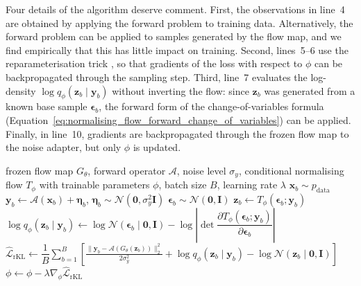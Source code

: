 \documentclass[12pt,a4paper]{report}
\begin{document}
Four details of the algorithm deserve comment. First, the observations in line~4 are obtained by applying the forward problem to training data. Alternatively, the forward problem can be applied to samples generated by the flow map, and we find empirically that this has little impact on training. Second, lines~5--6 use the reparameterisation trick \parencite{kingma2022autoencodingvariationalbayes}, so that gradients of the loss with respect to $\phi$ can be backpropagated through the sampling step.
Third, line~7 evaluates the log-density $\log q_{\phi}(\mathbf{z}_b\mid\mathbf{y}_b)$ without inverting the flow: since $\mathbf{z}_b$ was generated from a known base sample $\boldsymbol{\epsilon}_b$, the forward form of the change-of-variables formula (Equation~\ref{eq:normalising_flow_forward_change_of_variables}) can be applied. Finally, in line~10, gradients are backpropagated through the frozen flow map to the noise adapter, but only $\phi$ is updated.

\begin{algorithm}[H]
\caption{Training the noise adapter with the reverse-KL objective}
\label{alg:rkl}
\begin{algorithmic}[1]
\Require frozen flow map $G_{\theta}$, forward operator $\mathcal{A}$, noise level $\sigma_y$, conditional normalising flow $T_{\phi}$ with trainable parameters $\phi$, batch size $B$, learning rate $\lambda$
\Repeat
    \State $\mathbf{x}_b\sim p_{\mathrm{data}}$
    \State $\mathbf{y}_b\gets\mathcal{A}(\mathbf{x}_b)+\boldsymbol{\eta}_b$, \quad $\boldsymbol{\eta}_b\sim\mathcal{N}(\mathbf{0},\sigma_y^2\mathbf{I})$ 
    \State $\boldsymbol{\epsilon}_b\sim\mathcal{N}(\mathbf{0},\mathbf{I})$
    \State $\mathbf{z}_b\gets T_{\phi}(\boldsymbol{\epsilon}_b;\mathbf{y}_b)$ 
    \State $\log q_{\phi}(\mathbf{z}_b\mid\mathbf{y}_b)\gets\log\mathcal{N}(\boldsymbol{\epsilon}_b\mid\mathbf{0},\mathbf{I})-\log\left|\det\dfrac{\partial T_{\phi}(\boldsymbol{\epsilon}_b;\mathbf{y}_b)}{\partial\boldsymbol{\epsilon}_b}\right|$
  \EndFor
  \State $\hat{\mathcal{L}}_{\mathrm{rKL}}\gets\dfrac{1}{B}\displaystyle\sum_{b=1}^{B}\left[\frac{\lVert\mathbf{y}_b-\mathcal{A}(G_{\theta}(\mathbf{z}_b))\rVert_2^2}{2\sigma_y^2}+\log q_{\phi}(\mathbf{z}_b\mid\mathbf{y}_b)-\log\mathcal{N}(\mathbf{z}_b\mid\mathbf{0},\mathbf{I})\right]$
  \State $\phi\gets\phi-\lambda\nabla_{\phi}\hat{\mathcal{L}}_{\mathrm{rKL}}$ 
\end{algorithmic}
\end{algorithm}
\end{document}
